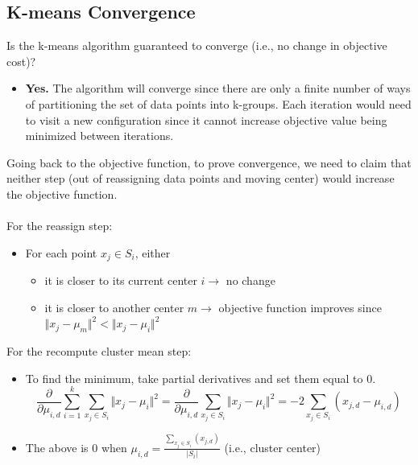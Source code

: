 \documentclass[10pt]{article}
\begin{document}
\subsection*{K-means Convergence}
Is the k-means algorithm guaranteed to converge (i.e., no change in objective cost)?
\begin{itemize}
    \item \textbf{Yes.}  The algorithm will converge since there are only a finite number of ways of partitioning the set of data points into k-groups.  Each iteration would need to visit a new configuration since it cannot increase objective value being minimized between iterations.
\end{itemize}
Going back to the objective function, to prove convergence, we need to claim that neither step (out of reassigning data points and moving center) would increase the objective function.\\\\
For the reassign step:
\begin{itemize}
    \item For each point $x_j \in S_i$, either
    \begin{itemize}
        \item it is closer to its current center $i \rightarrow$ no change
        \item it is closer to another center $m \rightarrow$ objective function improves since $\Vert x_j - \mu_m \Vert^2 < \Vert x_j - \mu_i \Vert^2$
    \end{itemize}
\end{itemize}
For the recompute cluster mean step:
\begin{itemize}
    \item To find the minimum, take partial derivatives and set them equal to 0.
    \[\frac{\partial}{\partial \mu_{i, d}} \sum_{i = 1}^k \sum_{x_j \in S_i} \Vert x_j - \mu_i \Vert^2 = \frac{\partial}{\partial \mu_{i, d}} \sum_{x_j \in S_i} \Vert x_j - \mu_i \Vert^2 = -2 \sum_{x_j \in S_i} (x_{j, d} - \mu_{i, d})\]
    \item The above is 0 when $\mu_{i, d} = \frac{\sum_{x_j \in S_i} (x_{j, d})}{|S_i|}$ (i.e., cluster center)
\end{itemize}
\end{document}
